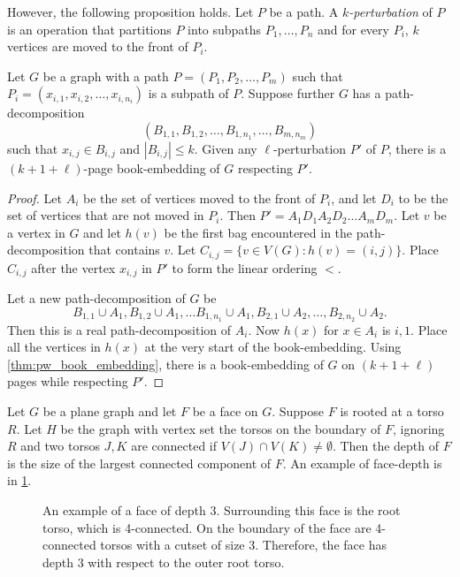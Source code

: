 However, the following proposition holds. Let $P$ be a path. A \textit{$k$-perturbation} of $P$ is an operation that partitions $P$ into subpaths $P_1, \ldots, P_n$ and for every $P_i$, $k$ vertices are moved to the front of $P_i$. 

\begin{proposition}\label{prop:k-perturbation}
	Let $G$ be a graph with a path $P = (P_1, P_2, \ldots, P_m)$ such that $P_i = (x_{i,1}, x_{i,2}, \ldots, x_{i, n_{i}})$ is a subpath of $P$. Suppose further $G$ has a path-decomposition \[(B_{1,1}, B_{1,2}, \ldots, B_{1,n_{1}}, \ldots, B_{m, n_{m}})\] such that $x_{i,j} \in B_{i,j}$ and $|B_{i,j}| \leq k$. Given any $\ell$-perturbation $P'$ of $P$, there is a $(k + 1 + \ell)$-page book-embedding of $G$ respecting $P'$.
\end{proposition}

\begin{proof}
	Let $A_i$ be the set of vertices moved to the front of $P_i$, and let $D_i$ to be the set of vertices that are not moved in $P_i$. Then $P' = A_1 D_1 A_2 D_2 \ldots A_m D_m$. 
	Let $v$ be a vertex in $G$ and let $h(v)$ be the first bag encountered in the path-decomposition that contains $v$.
	Let $C_{i,j} = \{v \in V(G): h(v) = (i,j)\}$. Place $C_{i,j}$ after the vertex $x_{i,j}$ in $P'$ to form the linear ordering $<$.

	Let a new path-decomposition of $G$ be \[B_{1,1} \cup A_1, B_{1,2} \cup A_1, \ldots B_{1, n_1} \cup A_1, B_{2,1} \cup A_2, \ldots, B_{2,n_2} \cup A_2.\] Then this is a real path-decomposition of $A_i$. Now $h(x)$ for $x \in A_i$ is ${i, 1}$. Place all the vertices in $h(x)$ at the very start of the book-embedding. Using \cref{thm:pw_book_embedding}, there is a book-embedding of $G$ on $(k + 1 + \ell)$ pages while respecting $P'$. 

\end{proof}

Let $G$ be a plane graph and let $F$ be a face on $G$. Suppose $F$ is rooted at a torso $R$. Let $H$ be the graph with vertex set the torsos on the boundary of $F$, ignoring $R$ and two torsos $J, K$ are connected if $V(J) \cap V(K) \neq \emptyset$. Then the depth of $F$ is the size of the largest connected component of $F$. An example of face-depth is in \cref{fig:face_depth}.

\begin{figure}
	\centering
	
	\caption[Face of depth 3]{An example of a face of depth 3. Surrounding this face is the root torso, which is 4-connected. On the boundary of the face are 4-connected torsos with a cutset of size 3.  Therefore, the face has depth 3 with respect to the outer root torso.}\label{fig:face_depth}
\end{figure}

